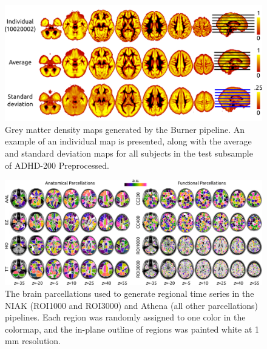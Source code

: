 \documentclass[preprint,12pt,3p]{elsarticle}
\begin{document}
\begin{figure}[!t]
\begin{center}
  \includegraphics[width=\linewidth]{fig_burner}
  \caption{Grey matter density maps generated by the Burner pipeline. An example of an individual map is presented, along with the average and standard deviation maps for all subjects in the test subsample of ADHD-200 Preprocessed.}
  \label{fig:burner}
\end{center}
\end{figure}

\begin{figure}[!t]
\begin{center}
  \includegraphics[width=\linewidth]{fig_parcels}
  \caption{The brain parcellations used to generate regional time series in the NIAK (ROI1000 and ROI3000) and Athena (all other parcellations) pipelines. Each region was randomly assigned to one color in the colormap, and the in-plane outline of regions was painted white at 1 mm resolution.}
  \label{fig:parcels}
\end{center}
\end{figure}
\end{document}
